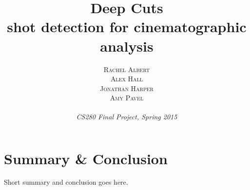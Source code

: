 \documentclass[a4paper, 9pt]{proc} %
\title{\textbf{Deep Cuts}\\ %
\Large{shot detection for cinematographic analysis}} %
\author{\textsc{Rachel Albert\\ Alex Hall\\ Jonathan Harper\\ Amy Pavel} %
\\{\textit{\\CS280 Final Project, Spring 2015}}} %
\makeatletter
\renewcommand{\maketitle}{ %
\begin{centering} %
{\huge\@title} %

\vspace{20pt} %

{\large\@author} %

\vspace{10pt} %
\end{centering}
}
\makeatother
\begin{document}
\maketitle %



%
%










\section*{Summary \& Conclusion}

Short summary and conclusion goes here.






\end{document}
